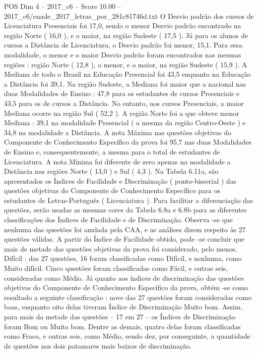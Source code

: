 \begin{textsample}{POS Dim 4 – 2017\_c6 – Score 10.00 – 2017\_c6/enade\_2017\_letras\_por\_281c81746d.txt}
O Desvio padrão dos cursos de Licenciatura Presenciais foi 17,0, sendo o menor Desvio padrão encontrado na região Norte ( 16,0 ), e o maior, na região Sudeste ( 17,5 ).
Já para os alunos de cursos a Distância de Licenciatura, o Desvio padrão foi menor, 15,1.
Para essa modalidade, o menor e o maior Desvio padrão foram encontrados nas mesmas regiões : região Norte ( 12,8 ), o menor, e o maior, na região Sudeste ( 15,9 ).
A Mediana de todo o Brasil na Educação Presencial foi 43,5 enquanto na Educação a Distância foi 39,1.
Na região Sudeste, a Mediana foi maior que a nacional nas duas Modalidades de Ensino : 47,8 para os estudantes de cursos Presenciais e 43,5 para os de cursos a Distância.
No entanto, nos cursos Presenciais, a maior Mediana ocorre na região Sul ( 52,2 ).
A região Norte foi a que obteve menor Mediana : 39,1 na modalidade Presencial ( a mesma da região Centro-Oeste ) e 34,8 na modalidade a Distância.
A nota Máxima nas questões objetivas do Componente de Conhecimento Específico da prova foi 95,7 nas duas Modalidades de Ensino e, consequentemente, a mesma para o total de estudantes de Licenciatura.
A nota Mínima foi diferente de zero apenas na modalidade a Distância nas regiões Norte ( 13,0 ) e Sul ( 4,3 ).
Na Tabela 6.11a, são apresentados os Índices de Facilidade e Discriminação ( ponto-bisserial ) das questões objetivas do Componente de Conhecimento Específico para os estudantes de Letras-Português ( Licenciatura ).
Para facilitar a diferenciação das questões, serão usadas as mesmas cores da Tabela 6.8a e 6.8b para as diferentes classificações dos Índices de Facilidade e de Discriminação.
Observa -se que nenhuma das questões foi anulada pela CAA, e as análises dizem respeito às 27 questões válidas.
A partir do Índice de Facilidade obtido, pode -se concluir que mais de metade das questões objetivas da prova foi considerado, pelo menos, Difícil : das 27 questões, 16 foram classificadas como Difícil, e nenhuma, como Muito difícil.
Cinco questões foram classificadas como Fácil, e outras seis, consideradas como Médio.
Já quanto aos índices de discriminação das questões objetivas do Componente de Conhecimento Específico da prova, obtém -se como resultado a seguinte classificação : nove das 27 questões foram consideradas como boas, enquanto oito delas tiveram Índice de Discriminação Muito bom.
Assim, para mais da metade das questões – 17 em 27 – os Índices de Discriminação foram Bom ou Muito bom.
Dentre as demais, quatro delas foram classificadas como Fraco, e outras seis, como Médio, sendo dez, por conseguinte, a quantidade de questões nos dois patamares mais baixos de discriminação.

\end{textsample}
